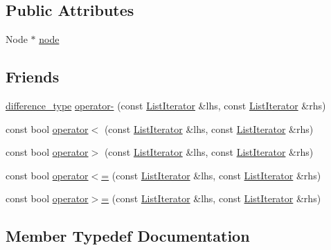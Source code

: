 \subsection*{Public Attributes}
\begin{DoxyCompactItemize}
\item 
Node $\ast$ \hyperlink{structprism_1_1_list_iterator_a7cbe2359c823f13675bcc1c6bba48142}{node}
\end{DoxyCompactItemize}
\subsection*{Friends}
\begin{DoxyCompactItemize}
\item 
\hyperlink{structprism_1_1_list_iterator_a1353d7adf61676d3913acaa1b00fed94}{difference\+\_\+type} \hyperlink{structprism_1_1_list_iterator_a01e380163ea6e4fb773286d7bd686849}{operator-\/} (const \hyperlink{structprism_1_1_list_iterator}{List\+Iterator} \&lhs, const \hyperlink{structprism_1_1_list_iterator}{List\+Iterator} \&rhs)
\item 
const bool \hyperlink{structprism_1_1_list_iterator_aa7501fb72489926b6f26af9d96fed162}{operator$<$} (const \hyperlink{structprism_1_1_list_iterator}{List\+Iterator} \&lhs, const \hyperlink{structprism_1_1_list_iterator}{List\+Iterator} \&rhs)
\item 
const bool \hyperlink{structprism_1_1_list_iterator_ae2b61ea00839123548f4ba3be724099f}{operator$>$} (const \hyperlink{structprism_1_1_list_iterator}{List\+Iterator} \&lhs, const \hyperlink{structprism_1_1_list_iterator}{List\+Iterator} \&rhs)
\item 
const bool \hyperlink{structprism_1_1_list_iterator_a53203b9e759f5084811e75a8d1276e0c}{operator$<$=} (const \hyperlink{structprism_1_1_list_iterator}{List\+Iterator} \&lhs, const \hyperlink{structprism_1_1_list_iterator}{List\+Iterator} \&rhs)
\item 
const bool \hyperlink{structprism_1_1_list_iterator_a12d57faad45d47f800bafabff2c8fbd1}{operator$>$=} (const \hyperlink{structprism_1_1_list_iterator}{List\+Iterator} \&lhs, const \hyperlink{structprism_1_1_list_iterator}{List\+Iterator} \&rhs)
\end{DoxyCompactItemize}


\subsection{Member Typedef Documentation}
